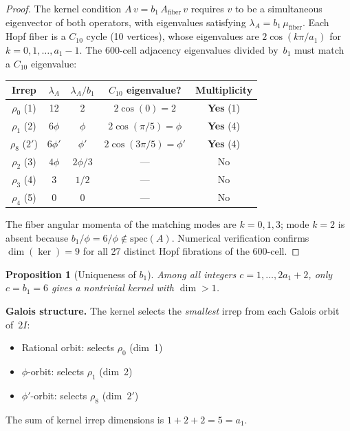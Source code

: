\documentclass[12pt,a4paper]{article}
\newtheorem{proposition}{Proposition}
\theoremstyle{definition}
\begin{document}
\begin{proof}
The kernel condition $A\,v = b_1\,A_{\text{fiber}}\,v$ requires $v$ to be a simultaneous eigenvector of both operators, with eigenvalues satisfying $\lambda_A = b_1\,\mu_{\text{fiber}}$.  Each Hopf fiber is a $C_{10}$ cycle (10 vertices), whose eigenvalues are $2\cos(k\pi/a_1)$ for $k = 0, 1, \ldots, a_1 - 1$.  The 600-cell adjacency eigenvalues divided by~$b_1$ must match a $C_{10}$ eigenvalue:

\begin{center}
\begin{tabular}{ccccc}
\toprule
Irrep & $\lambda_A$ & $\lambda_A / b_1$ & $C_{10}$ eigenvalue? & Multiplicity \\
\midrule
$\rho_0$ (1) & 12 & 2 & $2\cos(0) = 2$ & \textbf{Yes} (1) \\
$\rho_1$ (2) & $6\phi$ & $\phi$ & $2\cos(\pi/5) = \phi$ & \textbf{Yes} (4) \\
$\rho_8$ ($2'$) & $6\phi'$ & $\phi'$ & $2\cos(3\pi/5) = \phi'$ & \textbf{Yes} (4) \\
\midrule
$\rho_2$ (3) & $4\phi$ & $2\phi/3$ & --- & No \\
$\rho_3$ (4) & 3 & $1/2$ & --- & No \\
$\rho_4$ (5) & 0 & 0 & --- & No \\
\bottomrule
\end{tabular}
\end{center}
The fiber angular momenta of the matching modes are $k = 0, 1, 3$; mode $k = 2$ is absent because $b_1/\phi = 6/\phi \notin \text{spec}(A)$.  Numerical verification confirms $\dim(\ker) = 9$ for all 27 distinct Hopf fibrations of the 600-cell.
\end{proof}

\begin{proposition}[Uniqueness of $b_1$]\label{prop:S-b1-unique}
Among all integers $c = 1, \ldots, 2a_1 + 2$, only $c = b_1 = 6$ gives a nontrivial kernel with $\dim > 1$.
\end{proposition}

\textbf{Galois structure.}  The kernel selects the \emph{smallest} irrep from each Galois orbit of~$2I$:
\begin{itemize}
\item Rational orbit: selects $\rho_0$ (dim~1)
\item $\phi$-orbit: selects $\rho_1$ (dim~2)
\item $\phi'$-orbit: selects $\rho_8$ (dim~$2'$)
\end{itemize}
The sum of kernel irrep dimensions is $1 + 2 + 2 = 5 = a_1$.
\end{document}
